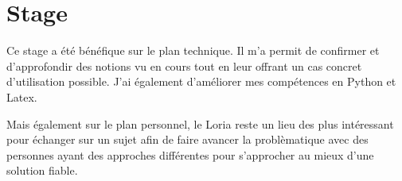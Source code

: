 \section{Stage}

Ce stage a été bénéfique sur le plan technique. Il m'a permit de confirmer et d'approfondir des notions vu en cours tout en leur offrant un cas concret d'utilisation possible. J'ai également d'améliorer mes compétences en Python et Latex.

\smallbreak

Mais également sur le plan personnel, le Loria reste un lieu des plus intéressant pour échanger sur un sujet afin de faire avancer la problèmatique avec des personnes ayant des approches différentes pour s'approcher au mieux d'une solution fiable.